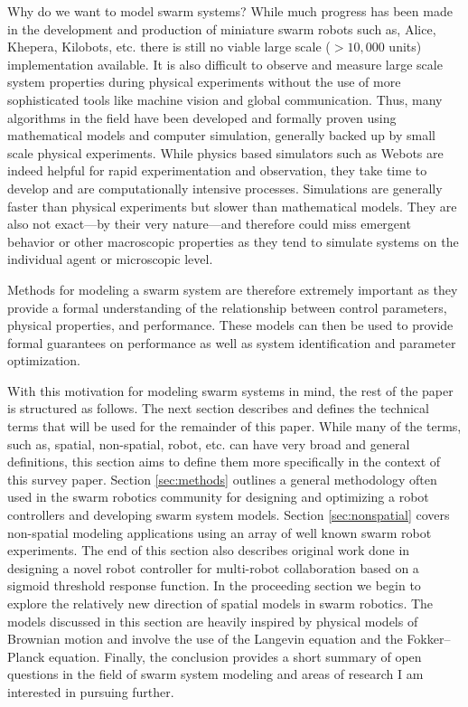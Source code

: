 \documentclass[Main.tex]{subfiles}
\begin{document}
Why do we want to model swarm systems? While much progress has been made in the development and production of miniature swarm robots such as, Alice, Khepera, Kilobots, etc.\cite{Dorigo2005,Seyfried2005,Mondada2009,Caprari1998,Rubenstein2012} there is still no viable large scale ($> 10,000$ units) implementation available. It is also difficult to observe and measure large scale system properties during physical experiments without the use of more sophisticated tools like machine vision and global communication. Thus, many algorithms in the field have been developed and formally proven using mathematical models and computer simulation, generally backed up by small scale physical experiments. While physics based simulators such as Webots\cite{Michel1998} are indeed helpful for rapid experimentation and observation, they take time to develop and are computationally intensive processes. Simulations are generally faster than physical experiments but slower than mathematical models. They are also not exact---by their very nature---and therefore could miss emergent behavior or other macroscopic properties as they tend to simulate systems on the individual agent or microscopic level. 

Methods for modeling a swarm system are therefore extremely important as they provide a formal understanding of the relationship between control parameters, physical properties, and performance. These models can then be used to provide formal guarantees on performance as well as system identification and parameter optimization\cite{Correll2006a,Correll2008}.

With this motivation for modeling swarm systems in mind, the rest of the paper is structured as follows. The next section describes and defines the technical terms that will be used for the remainder of this paper. While many of the terms, such as, spatial, non-spatial, robot, etc. can have very broad and general definitions, this section aims to define them more specifically in the context of this survey paper. Section \ref{sec:methods} outlines a general methodology often used in the swarm robotics community for designing and optimizing a robot controllers and developing swarm system models. Section \ref{sec:nonspatial} covers non-spatial modeling applications using an array of well known swarm robot experiments. The end of this section also describes original work done in designing a novel robot controller for multi-robot collaboration based on a sigmoid threshold response function. In the proceeding section we begin to explore the relatively new direction of spatial models in swarm robotics. The models discussed in this section are heavily inspired by physical models of Brownian motion and involve the use of the Langevin equation and the Fokker--Planck equation. Finally, the conclusion provides a short summary of open questions in the field of swarm system modeling and areas of research I am interested in pursuing further.
\end{document}
